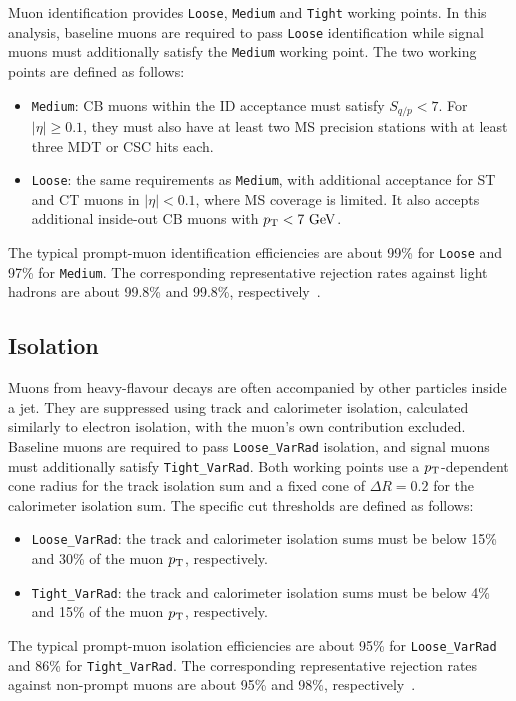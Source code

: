 Muon identification provides \texttt{Loose}, \texttt{Medium} and \texttt{Tight} working points.
In this analysis, baseline muons are required to pass \texttt{Loose} identification while signal muons must additionally satisfy the \texttt{Medium} working point. The two working points are defined as follows:
\begin{itemize}
    \item \texttt{Medium}: CB muons within the ID acceptance must satisfy $S_{q/p}<7$. For $|\eta|\geq0.1$, they must also have at least two MS precision stations with at least three MDT or CSC hits each.
    \item \texttt{Loose}: the same requirements as \texttt{Medium}, with additional acceptance for ST and CT muons in $|\eta|<0.1$, where MS coverage is limited.
    It also accepts additional inside-out CB muons with $p_{\mathrm{T}}<7~\mathrm{GeV}$.
\end{itemize}
The typical prompt-muon identification efficiencies are about 99\% for \texttt{Loose} and 97\% for \texttt{Medium}.
The corresponding representative rejection rates against light hadrons are about 99.8\% and 99.8\%, respectively~\cite{ATLAS2021MuonID}.

\subsection{Isolation}

Muons from heavy-flavour decays are often accompanied by other particles inside a jet.
They are suppressed using track and calorimeter isolation, calculated similarly to electron isolation, with the muon's own contribution excluded.
Baseline muons are required to pass \texttt{Loose\_VarRad} isolation, and signal muons must additionally satisfy \texttt{Tight\_VarRad}.
Both working points use a $p_{\mathrm{T}}$-dependent cone radius for the track isolation sum and a fixed cone of $\Delta R=0.2$ for the calorimeter isolation sum. The specific cut thresholds are defined as follows:
\begin{itemize}
    \item \texttt{Loose\_VarRad}: the track and calorimeter isolation sums must be below 15\% and 30\% of the muon $p_{\mathrm{T}}$, respectively.
    \item \texttt{Tight\_VarRad}: the track and calorimeter isolation sums must be below 4\% and 15\% of the muon $p_{\mathrm{T}}$, respectively.
\end{itemize}
The typical prompt-muon isolation efficiencies are about 95\% for \texttt{Loose\_VarRad} and 86\% for \texttt{Tight\_VarRad}.
The corresponding representative rejection rates against non-prompt muons are about 95\% and 98\%, respectively~\cite{Maricic2025MuonIsolation}.


